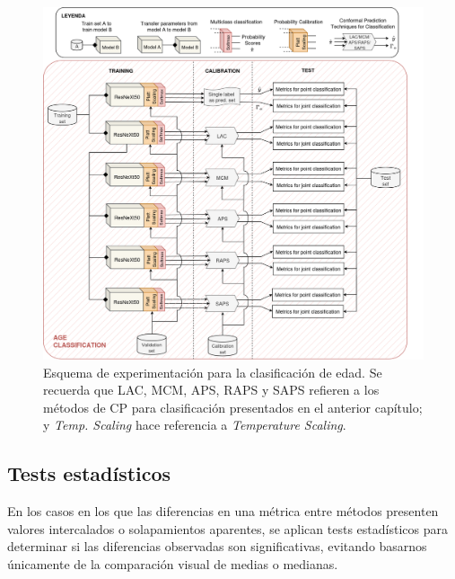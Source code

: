 \begin{figure}[h]
    \centering
    \includegraphics[angle=90, width=\textwidth]{capitulos/cap_05/imagenes/AGC_experimental_pipeline.png}
    \caption[
        Esquema de experimentación para la clasificación de edad. 
    ]{
        Esquema de experimentación para la clasificación de edad. Se recuerda que LAC, MCM, APS, RAPS y SAPS refieren a los métodos de CP para clasificación presentados en el anterior capítulo; y \textit{Temp. Scaling} hace referencia a \textit{Temperature Scaling}.
    } 
    \label{fig:AGC_experimental_pipeline}
\end{figure}

\FloatBarrier



\subsection{Tests estadísticos}

En los casos en los que las diferencias en una métrica entre métodos presenten valores intercalados o solapamientos aparentes, se aplican tests estadísticos para determinar si las diferencias observadas son significativas, evitando basarnos únicamente de la comparación visual de medias o medianas.

